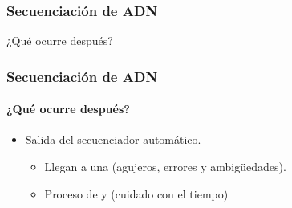 %
%


\frame
{
\frametitle{Secuenciación de ADN}
\begin{center}
	\huge{¿Qué ocurre después?}
\end{center}
}

\frame
{
\frametitle{Secuenciación de ADN}
\framesubtitle{¿Qué ocurre después?}
\begin{itemize}
	\item Salida del secuenciador automático.
	\begin{itemize}
		\item Llegan a una  (agujeros, errores y ambigüedades).
		\item Proceso de  y  (cuidado con el tiempo)
	\end{itemize}
\end{itemize}
}

